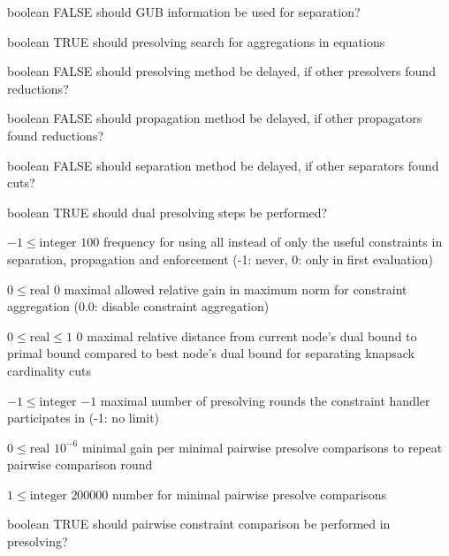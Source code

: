 %
{boolean}%
{FALSE}%
{should GUB information be used for separation?}%
{}

%
{boolean}%
{TRUE}%
{should presolving search for aggregations in equations}%
{}

%
{boolean}%
{FALSE}%
{should presolving method be delayed, if other presolvers found reductions?}%
{}

%
{boolean}%
{FALSE}%
{should propagation method be delayed, if other propagators found reductions?}%
{}

%
{boolean}%
{FALSE}%
{should separation method be delayed, if other separators found cuts?}%
{}

%
{boolean}%
{TRUE}%
{should dual presolving steps be performed?}%
{}

%
{$-1\leq\textrm{integer}$}%
{$100$}%
{frequency for using all instead of only the useful constraints in separation, propagation and enforcement (-1: never, 0: only in first evaluation)}%
{}

%
{$0\leq\textrm{real}$}%
{$0$}%
{maximal allowed relative gain in maximum norm for constraint aggregation (0.0: disable constraint aggregation)}%
{}

%
{$0\leq\textrm{real}\leq1$}%
{$0$}%
{maximal relative distance from current node's dual bound to primal bound compared to best node's dual bound for separating knapsack cardinality cuts}%
{}

%
{$-1\leq\textrm{integer}$}%
{$-1$}%
{maximal number of presolving rounds the constraint handler participates in (-1: no limit)}%
{}

%
{$0\leq\textrm{real}$}%
{$10^{- 6}$}%
{minimal gain per minimal pairwise presolve comparisons to repeat pairwise comparison round}%
{}

%
{$1\leq\textrm{integer}$}%
{$200000$}%
{number for minimal pairwise presolve comparisons}%
{}

%
{boolean}%
{TRUE}%
{should pairwise constraint comparison be performed in presolving?}%
{}

